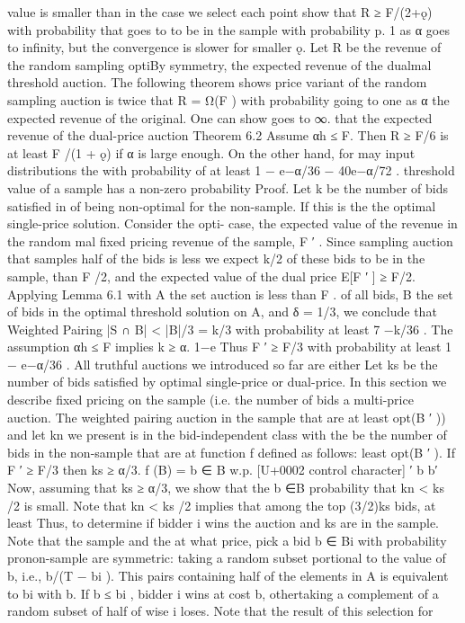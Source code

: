 \documentclass[10pt]{article}
\begin{document}
\begin{ReviewVerbatim}
value is smaller than in the case we select each point show that R ≥ F/(2+ǫ) with probability that goes to
to be in the sample with probability p.
1 as α goes to infinity, but the convergence is slower
for smaller ǫ.
Let R be the revenue of the random sampling optiBy symmetry, the expected revenue of the dualmal threshold auction. The following theorem shows price variant of the random sampling auction is twice
that R = Ω(F ) with probability going to one as α the expected revenue of the original. One can show
goes to ∞.
that the expected revenue of the dual-price auction
Theorem 6.2 Assume αh ≤ F. Then R ≥ F/6 is at least F /(1 + ǫ) if α is large enough.
On the other hand, for may input distributions the
with probability of at least 1 − e−α/36 − 40e−α/72 .
threshold value of a sample has a non-zero probability
Proof. Let k be the number of bids satisfied in of being non-optimal for the non-sample. If this is the
the optimal single-price solution. Consider the opti- case, the expected value of the revenue in the random
mal fixed pricing revenue of the sample, F ′ . Since sampling auction that samples half of the bids is less
we expect k/2 of these bids to be in the sample, than F /2, and the expected value of the dual price
E[F ′ ] ≥ F/2. Applying Lemma 6.1 with A the set auction is less than F .
of all bids, B the set of bids in the optimal threshold solution on A, and δ = 1/3, we conclude that
Weighted Pairing
|S ∩ B| < |B|/3 = k/3 with probability at least 7
−k/36
. The assumption αh ≤ F implies k ≥ α.
1−e
Thus F ′ ≥ F/3 with probability at least 1 − e−α/36 . All truthful auctions we introduced so far are either
Let ks be the number of bids satisfied by optimal single-price or dual-price. In this section we describe
fixed pricing on the sample (i.e. the number of bids a multi-price auction. The weighted pairing auction
in the sample that are at least opt(B ′ )) and let kn we present is in the bid-independent class with the
be the number of bids in the non-sample that are at function f defined as follows:
least opt(B ′ ). If F ′ ≥ F/3 then ks ≥ α/3.
f (B) = b ∈ B w.p. [U+0002 control character] ′ b b′
Now, assuming that ks ≥ α/3, we show that the
b ∈B
probability that kn < ks /2 is small. Note that kn <
ks /2 implies that among the top (3/2)ks bids, at least Thus, to determine if bidder i wins the auction and
ks are in the sample. Note that the sample and the at what price, pick a bid b ∈ Bi with probability pronon-sample are symmetric: taking a random subset portional to the value of b, i.e., b/(T − bi ). This pairs
containing half of the elements in A is equivalent to bi with b. If b ≤ bi , bidder i wins at cost b, othertaking a complement of a random subset of half of wise i loses. Note that the result of this selection for

\end{ReviewVerbatim}
\end{document}
